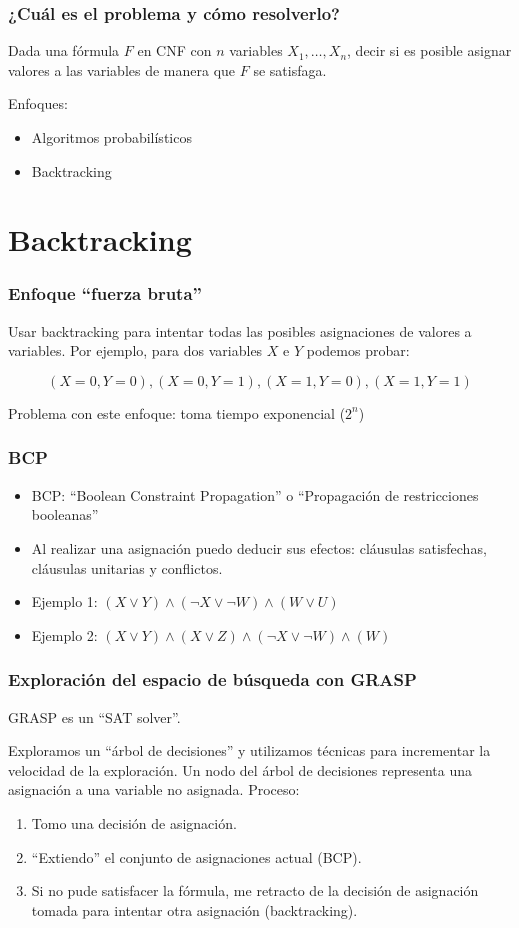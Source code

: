 \documentclass{beamer}
\begin{document}
\frame
{
  \frametitle{¿Cuál es el problema y cómo resolverlo?}

  Dada una fórmula $F$ en CNF con $n$ variables $X_1, \ldots, X_n$, decir si es
  posible asignar valores a las variables de manera que $F$ se satisfaga.

  Enfoques:

  \begin{itemize}
  \item Algoritmos probabilísticos
  \item Backtracking
  \end{itemize}
}

\section{Backtracking}

\frame
{
  \frametitle{Enfoque ``fuerza bruta''}

  Usar backtracking para intentar todas las posibles asignaciones de valores a variables. Por
  ejemplo, para dos variables $X$ e $Y$ podemos probar:

  $$
  (X=0,Y=0), (X=0,Y=1), (X=1,Y=0), (X=1,Y=1)
  $$

  Problema con este enfoque: toma tiempo exponencial ($2^n$)
}

\frame
{
  \frametitle{BCP}

  \begin{itemize}
   \item BCP: ``Boolean Constraint Propagation'' o ``Propagación de restricciones booleanas''
   \item Al realizar una asignación puedo deducir sus efectos: cláusulas satisfechas, cláusulas unitarias y conflictos.
   \item Ejemplo 1: $(X \vee Y) \wedge (\neg X \vee \neg W) \wedge (W \vee U)$
   \item Ejemplo 2: $(X \vee Y) \wedge (X \vee Z) \wedge (\neg X \vee \neg W) \wedge (W)$
  \end{itemize}
}

\frame
{
  \frametitle{Exploración del espacio de búsqueda con GRASP}

  GRASP es un ``SAT solver''.

  Exploramos un ``árbol de decisiones'' y utilizamos técnicas
  para incrementar la velocidad de la exploración. Un nodo del árbol
  de decisiones representa una asignación a una variable no asignada.
  Proceso:

  \begin{enumerate}
   \item Tomo una decisión de asignación.
   \item ``Extiendo'' el conjunto de asignaciones actual (BCP).
   \item Si no pude satisfacer la fórmula, me retracto de la decisión de
         asignación tomada para intentar otra asignación (backtracking).
  \end{enumerate}
}
\end{document}
